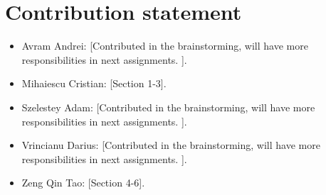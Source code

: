 \documentclass[10pt,a4paper]{article}
\begin{document}
\section*{Contribution statement}
\begin{itemize}[leftmargin=1.2em]
\item Avram Andrei: [Contributed in the brainstorming, will have more responsibilities in
next assignments.
].
\item Mihaiescu Cristian: [Section 1-3].
\item Szelestey Adam: [Contributed in the brainstorming, will have more responsibilities in
next assignments.
].
\item Vrincianu Darius: [Contributed in the brainstorming, will have more responsibilities in
next assignments.
].
\item Zeng Qin Tao: [Section 4-6].
\end{itemize}
\end{document}

